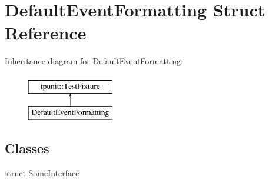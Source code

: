\hypertarget{structDefaultEventFormatting}{}\section{Default\+Event\+Formatting Struct Reference}
\label{structDefaultEventFormatting}
Inheritance diagram for Default\+Event\+Formatting\+:\begin{figure}[H]
\begin{center}
\leavevmode
\includegraphics[height=2.000000cm]{structDefaultEventFormatting}
\end{center}
\end{figure}
\subsection*{Classes}
\begin{DoxyCompactItemize}
\item 
struct \mbox{\hyperlink{structDefaultEventFormatting_1_1SomeInterface}{Some\+Interface}}
\end{DoxyCompactItemize}
